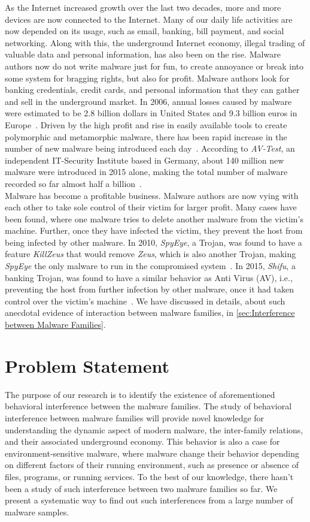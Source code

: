 As the Internet increased growth over the last two decades, more and more devices are now connected to the Internet.
Many of our daily life activities are now depended on its usage, such as email, banking, bill payment, and social networking.
Along with this, the underground Internet economy, illegal trading of valuable data and personal information, has also been on the rise.
Malware authors now do not write malware just for fun, to create annoyance or break into some system for bragging rights, but also for profit.
Malware authors look for banking credentials, credit cards, and personal information that they can gather and sell in the underground market.
In 2006, annual losses caused by malware were estimated to be 2.8 billion dollars in United States and 9.3 billion euros in Europe~\cite[]{moore2009economics}.
Driven by the high profit and rise in easily available tools to create polymorphic and metamorphic malware, there has been rapid increase in the number of new malware being introduced each day~\cite[]{tian}.
According to \emph{AV-Test}, an independent IT-Security Institute based in Germany, about 140 million new malware were introduced in 2015 alone, making the total number of malware recorded so far almost half a billion~\cite[]{avtest}.\\

Malware has become a profitable business.
Malware authors are now vying with each other to take sole control of their victim for larger profit.
Many cases have been found, where one malware tries to delete another malware from the victim's machine.
Further, once they have infected the victim, they prevent the host from being infected by other malware.
In 2010, \emph{SpyEye}, a Trojan, was found to have a feature \emph{KillZeus} that would remove \emph{Zeus}, which is also another Trojan, making \emph{SpyEye} the only malware to run in the compromised system~\cite[]{sanszeus}.
In 2015, \emph{Shifu}, a banking Trojan, was found to have a similar behavior as Anti Virus (AV), i.e., preventing the host from further infection by other malware, once it had taken control over the victim's machine~\cite[]{secintelshifu}.
We have discussed in details, about such anecdotal evidence of interaction between malware families, in \autoref{sec:Interference between Malware Families}.
\section{Problem Statement}
\label{sec:Problem Statement}
The purpose of our research is to identify the existence of aforementioned behavioral interference between the malware families.
The study of behavioral interference between malware families will provide novel knowledge for understanding the dynamic aspect of modern malware, the inter-family relations, and their associated underground economy.
This behavior is also a case for environment-sensitive malware, where malware change their behavior depending on different factors of their running environment, such as presence or absence of files, programs, or running services.
To the best of our knowledge, there hasn't been a study of such interference between two malware families so far.
We present a systematic way to find out such interferences from a large number of malware samples.


